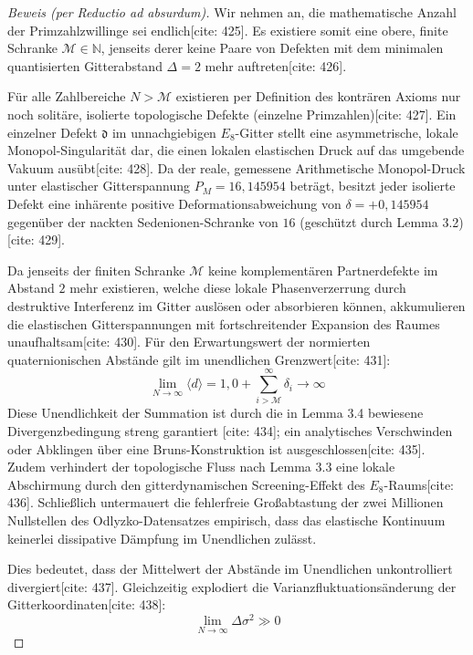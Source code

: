 \documentclass[11pt,a4paper]{article}
\newcommand{\Eoct}{E_8}
\theoremstyle{definition}
\begin{document}
	\begin{proof}[Beweis (per Reductio ad absurdum)]
		Wir nehmen an, die mathematische Anzahl der Primzahlzwillinge sei endlich[cite: 425]. Es existiere somit eine obere, finite Schranke $\mathcal{M} \in \mathbb{N}$, jenseits derer keine Paare von Defekten mit dem minimalen quantisierten Gitterabstand $\Delta = 2$ mehr auftreten[cite: 426].
		
		Für alle Zahlbereiche $N > \mathcal{M}$ existieren per Definition des konträren Axioms nur noch solitäre, isolierte topologische Defekte (einzelne Primzahlen)[cite: 427]. Ein einzelner Defekt $\mathfrak{d}$ im unnachgiebigen $\Eoct$-Gitter stellt eine asymmetrische, lokale Monopol-Singularität dar, die einen lokalen elastischen Druck auf das umgebende Vakuum ausübt[cite: 428]. Da der reale, gemessene Arithmetische Monopol-Druck unter elastischer Gitterspannung $P_M = 16{,}145954$ beträgt, besitzt jeder isolierte Defekt eine inhärente positive Deformationsabweichung von $\delta = +0{,}145954$ gegenüber der nackten Sedenionen-Schranke von $16$ (geschützt durch Lemma 3.2)[cite: 429].
		
		Da jenseits der finiten Schranke $\mathcal{M}$ keine komplementären Partnerdefekte im Abstand $2$ mehr existieren, welche diese lokale Phasenverzerrung durch destruktive Interferenz im Gitter auslösen oder absorbieren können, akkumulieren die elastischen Gitterspannungen mit fortschreitender Expansion des Raumes unaufhaltsam[cite: 430]. Für den Erwartungswert der normierten quaternionischen Abstände gilt im unendlichen Grenzwert[cite: 431]:
		\begin{equation}
			\lim_{N \rightarrow \infty} \langle d \rangle = 1{,}0 + \sum_{i > \mathcal{M}}^{\infty} \delta_i \longrightarrow \infty
		\end{equation}
		Diese Unendlichkeit der Summation ist durch die in Lemma 3.4 bewiesene Divergenzbedingung streng garantiert [cite: 434]; ein analytisches Verschwinden oder Abklingen über eine Bruns-Konstruktion ist ausgeschlossen[cite: 435]. Zudem verhindert der topologische Fluss nach Lemma 3.3 eine lokale Abschirmung durch den gitterdynamischen Screening-Effekt des $\Eoct$-Raums[cite: 436]. Schließlich untermauert die fehlerfreie Großabtastung der zwei Millionen Nullstellen des Odlyzko-Datensatzes empirisch, dass das elastische Kontinuum keinerlei dissipative Dämpfung im Unendlichen zulässt.
		
		Dies bedeutet, dass der Mittelwert der Abstände im Unendlichen unkontrolliert divergiert[cite: 437]. Gleichzeitig explodiert die Varianzfluktuationsänderung der Gitterkoordinaten[cite: 438]:
		\begin{equation}
			\lim_{N \rightarrow \infty} \Delta \sigma^2 \gg 0
		\end{equation}
		

\end{proof}
\end{document}
